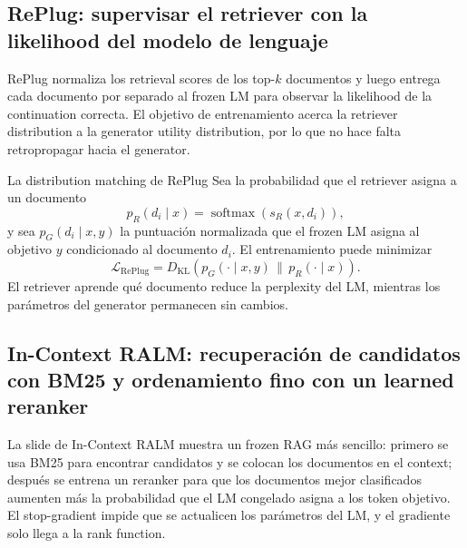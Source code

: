\subsection{RePlug: supervisar el retriever con la likelihood del modelo de lenguaje}

RePlug normaliza los retrieval scores de los top-$k$ documentos y luego entrega cada documento por separado al frozen LM para observar la likelihood de la continuation correcta. El objetivo de entrenamiento acerca la retriever distribution a la generator utility distribution, por lo que no hace falta retropropagar hacia el generator.


\begin{importantbox}{La distribution matching de RePlug}
Sea la probabilidad que el retriever asigna a un documento
\[
p_R(d_i\mid x)=\operatorname{softmax}(s_R(x,d_i)),
\]
y sea $p_G(d_i\mid x,y)$ la puntuación normalizada que el frozen LM asigna al objetivo $y$ condicionado al documento $d_i$. El entrenamiento puede minimizar
\[
\mathcal{L}_{\text{RePlug}}=D_{\mathrm{KL}}\!\left(p_G(\cdot\mid x,y)\,\|\,p_R(\cdot\mid x)\right).
\]
El retriever aprende qué documento reduce la perplexity del LM, mientras los parámetros del generator permanecen sin cambios.
\end{importantbox}


\subsection{In-Context RALM: recuperación de candidatos con BM25 y ordenamiento fino con un learned reranker}

La slide de In-Context RALM muestra un frozen RAG más sencillo: primero se usa BM25 para encontrar candidatos y se colocan los documentos en el context; después se entrena un reranker para que los documentos mejor clasificados aumenten más la probabilidad que el LM congelado asigna a los token objetivo. El stop-gradient impide que se actualicen los parámetros del LM, y el gradiente solo llega a la rank function.

